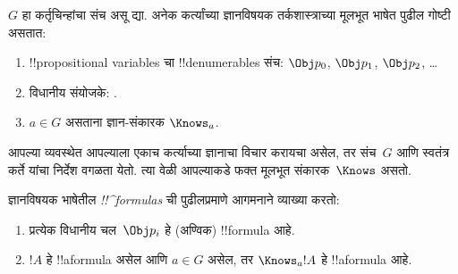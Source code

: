 \documentclass[../../../include/open-logic-section]{subfiles}
\begin{document}


\begin{defn}
$G$ हा कर्तृचिन्हांचा संच असू द्या. अनेक कर्त्यांच्या
ज्ञानविषयक तर्कशास्त्राच्या मूलभूत भाषेत पुढील गोष्टी
असतात:
\begin{enumerate}
  \item !!{propositional variable}s चा !!{denumerable}s संच: $\Obj
    p_0$, $\Obj p_1$, $\Obj p_2$, \dots
  \item विधानीय संयोजके: \startycommalist
  .
  \item $a \in G$ असताना ज्ञान-संकारक $\Knows_a$.
\end{enumerate}
\end{defn}

आपल्या व्यवस्थेत आपल्याला एकाच कर्त्याच्या ज्ञानाचा
विचार करायचा असेल, तर संच~$G$ आणि स्वतंत्र कर्ते
यांचा निर्देश वगळता येतो. त्या वेळी आपल्याकडे फक्त
मूलभूत संकारक~$\Knows$ असतो.

\begin{defn}
ज्ञानविषयक भाषेतील \emph{!!^{formula}s} ची पुढीलप्रमाणे
  आगमनाने व्याख्या करतो:
\begin{enumerate}


\item प्रत्येक विधानीय चल~$\Obj p_i$ हे (अण्विक) !!{formula} आहे.






\item $!A$ हे !!a{formula} असेल आणि $a \in G$ असेल,
  तर $\Knows_a !A$ हे !!a{formula} आहे.

\end{enumerate}
\end{defn}
\end{document}
